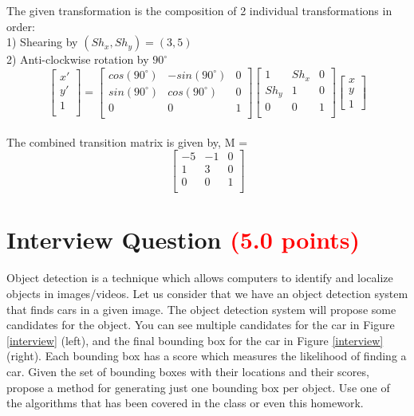 \documentclass[answers]{exam}
\newcommand{\mypoints}[1]{\textcolor{red}{(#1 points)}}
\begin{document}
\begin{solution}
The given transformation is the composition of 2 individual transformations in order:\\
1) Shearing by $(Sh_x, Sh_y) = (3,5)$ \\
2) Anti-clockwise rotation by $90^{\circ}$ \\

$$
\begin{bmatrix} 
x'\\
y'\\
1\\
\end{bmatrix}
=
\begin{bmatrix}
cos(90^{\circ}) & -sin(90^{\circ}) & 0\\
sin(90^{\circ}) & cos(90^{\circ}) & 0\\
0 & 0 & 1\\
\end{bmatrix}
\begin{bmatrix}
1 & Sh_x & 0\\
Sh_y & 1 & 0\\
0 & 0 & 1\\
\end{bmatrix}
\begin{bmatrix}
x\\
y\\
1
\end{bmatrix}
$$\\
The combined transition matrix is given by, M =\\
$$
\begin{bmatrix}
-5 & -1 & 0\\
1 & 3 & 0\\
0 & 0 & 1\\
\end{bmatrix}$$
\end{solution}

\newpage 

\section{Interview Question \mypoints{5.0}}

Object detection is a technique which allows computers to identify and localize objects in images/videos. Let us consider that we have an object detection system that finds cars in a given image. The object detection system will propose some candidates for the object. You can see multiple candidates for the car in Figure \ref{interview} (left), and the final bounding box for the car in Figure \ref{interview} (right). Each bounding box has a score which measures the likelihood of finding a car. Given the set of bounding boxes with their locations and their scores, propose a method for generating just one bounding box per object. Use one of the algorithms that has been covered in the class or even this homework.
\end{document}
